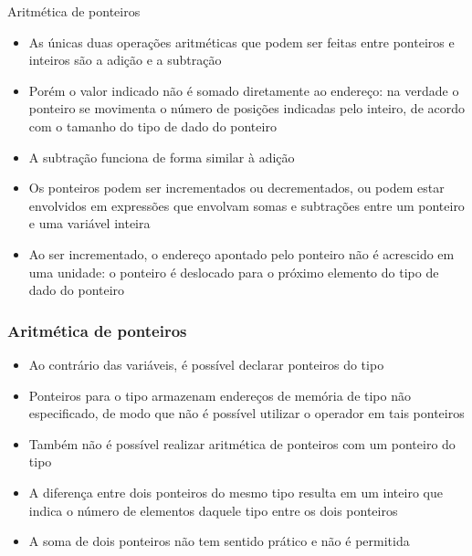 \begin{frame}[fragile]{Aritmética de ponteiros}

	\begin{itemize}
		\item As únicas duas operações aritméticas que podem ser feitas entre ponteiros e inteiros 
        são a adição e a subtração

		\item Porém o valor indicado não é somado diretamente ao endereço: na verdade o ponteiro 
        se movimenta o número de posições indicadas pelo inteiro, de acordo com o 
		tamanho do tipo de dado do ponteiro
		
		\item A subtração funciona de forma similar à adição

		\item Os ponteiros podem ser incrementados ou decrementados, ou podem estar envolvidos em 
        expressões que envolvam somas e subtrações entre um ponteiro e uma variável inteira

		\item Ao ser incrementado, o endereço apontado pelo ponteiro não é acrescido em uma 
        unidade: o ponteiro é deslocado para o próximo elemento do tipo de dado do ponteiro
	\end{itemize}

\end{frame}

\begin{frame}

	\frametitle{Aritmética de ponteiros}

	\begin{itemize} 
        \item Ao contrário das variáveis, é possível declarar ponteiros do tipo 

        \item Ponteiros para o tipo  armazenam endereços de memória de
        tipo não especificado, de modo que não é possível utilizar o operador 
         em tais ponteiros

		\item Também não é possível realizar aritmética de ponteiros 
		com um ponteiro do tipo 

		\item A diferença entre dois ponteiros do mesmo tipo 
		resulta em um inteiro que indica o número de elementos
		daquele tipo entre os dois ponteiros

		\item A soma de dois ponteiros não tem sentido prático e não é permitida
	\end{itemize}

\end{frame}

